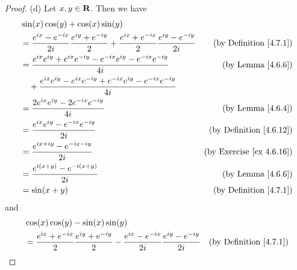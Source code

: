 \begin{proof}{(d)}
    Let \(x, y \in \mathbf{R}\).
    Then we have
    \begin{align*}
         & \sin(x) \cos(y) + \cos(x) \sin(y)                                                                                                                                     \\
         & = \frac{e^{i x} - e^{- i x}}{2 i} \frac{e^{i y} + e^{- i y}}{2} + \frac{e^{i x} + e^{- i x}}{2} \frac{e^{i y} - e^{- i y}}{2i} & \text{(by Definition \ref{4.7.1})}   \\
         & = \frac{e^{i x} e^{i y} + e^{i x} e^{- i y} - e^{- i x} e^{i y} - e^{- i x} e^{- i y}}{4i}                                     & \text{(by Lemma \ref{4.6.6})}        \\
         & \quad + \frac{e^{i x} e^{i y} - e^{i x} e^{- i y} + e^{- i x} e^{i y} - e^{- i x} e^{- i y}}{4i}                                                                      \\
         & = \frac{2 e^{i x} e^{i y} - 2 e^{- i x} e^{- i y}}{4i}                                                                         & \text{(by Lemma \ref{4.6.4})}        \\
         & = \frac{e^{i x} e^{i y} - e^{- i x} e^{- i y}}{2i}                                                                             & \text{(by Definition \ref{4.6.12})}  \\
         & = \frac{e^{i x + i y} - e^{- i x - i y}}{2i}                                                                                   & \text{(by Exercise \ref{ex 4.6.16})} \\
         & = \frac{e^{i (x + y)} - e^{- i (x + y)}}{2i}                                                                                   & \text{(by Lemma \ref{4.6.6})}        \\
         & = \sin(x + y)                                                                                                                  & \text{(by Definition \ref{4.7.1})}
    \end{align*}
    and
    \begin{align*}
         & \cos(x) \cos(y) - \sin(x) \sin(y)                                                                                                                                    \\
         & = \frac{e^{i x} + e^{- i x}}{2} \frac{e^{i y} + e^{- i y}}{2} - \frac{e^{i x} - e^{- i x}}{2i} \frac{e^{i y} - e^{- i y}}{2i} & \text{(by Definition \ref{4.7.1})}   \\

\end{align*}
\end{proof}
